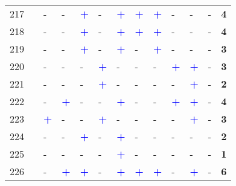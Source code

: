 \begin{longtable}{p{0.5cm}p{4.6cm}p{0.3cm}p{0.3cm}p{0.3cm}p{0.3cm}p{0.3cm}p{0.3cm}p{0.3cm}p{0.3cm}p{0.3cm}p{0.3cm}p{1cm}}
    \small{217} & \small{\textcite{yang_bike-and-ride_2014}}\index{Yang, Liu|pagebf}\index{Yang, Liu|pagebf} & - & - & \textcolor{blue}{\textbf{+}} & - & \textcolor{blue}{\textbf{+}} & \textcolor{blue}{\textbf{+}} & \textcolor{blue}{\textbf{+}} & - & - & - & \textbf{4}\\
    \small{218} & \small{\textcite{yang_empirical_2016}}\index{Yang, Min|pagebf} & - & - & \textcolor{blue}{\textbf{+}} & - & \textcolor{blue}{\textbf{+}} & \textcolor{blue}{\textbf{+}} & \textcolor{blue}{\textbf{+}} & - & - & - & \textbf{4}\\
    \small{219} & \small{\textcite{yang_metro_2015}}\index{Yang, Min|pagebf} & - & - & \textcolor{blue}{\textbf{+}} & - & \textcolor{blue}{\textbf{+}} & - & \textcolor{blue}{\textbf{+}} & - & - & - & \textbf{3}\\
    \small{220} & \small{\textcite{yang_spatiotemporal_2019}}\index{Yang, Yuanxuan|pagebf} & - & - & - & \textcolor{blue}{\textbf{+}} & - & - & - & \textcolor{blue}{\textbf{+}} & \textcolor{blue}{\textbf{+}} & - & \textbf{3}\\
    \small{221} & \small{\textcite{yen_how_2023}}\index{Yen, Barbara T.H.|pagebf} & - & - & - & \textcolor{blue}{\textbf{+}} & - & - & - & - & \textcolor{blue}{\textbf{+}} & - & \textbf{2}\\
    \small{222} & \small{\textcite{yu_policy_2021}}\index{Yu, Qing|pagebf} & - & \textcolor{blue}{\textbf{+}} & - & - & \textcolor{blue}{\textbf{+}} & - & - & \textcolor{blue}{\textbf{+}} & \textcolor{blue}{\textbf{+}} & - & \textbf{4}\\
    \small{223} & \small{\textcite{yu_understanding_2021}}\index{Yu, Senbin|pagebf} & \textcolor{blue}{\textbf{+}} & - & - & \textcolor{blue}{\textbf{+}} & - & - & - & - & \textcolor{blue}{\textbf{+}} & - & \textbf{3}\\
    \small{224} & \small{\textcite{zhang_make_2023}}\index{Zhang, Mengyuan|pagebf} & - & - & \textcolor{blue}{\textbf{+}} & - & \textcolor{blue}{\textbf{+}} & - & - & - & - & - & \textbf{2}\\
    \small{225} & \small{\textcite{zhang_bicyclemetro_2019}}\index{Zhang, Ze|pagebf} & - & - & - & - & \textcolor{blue}{\textbf{+}} & - & - & - & - & - & \textbf{1}\\
    \small{226} & \small{\textcite{zhao_bicycle-metro_2017}}\index{Zhao, Pengjun|pagebf} & - & \textcolor{blue}{\textbf{+}} & \textcolor{blue}{\textbf{+}} & - & \textcolor{blue}{\textbf{+}} & \textcolor{blue}{\textbf{+}} & \textcolor{blue}{\textbf{+}} & - & \textcolor{blue}{\textbf{+}} & - & \textbf{6}\\

\end{longtable}
